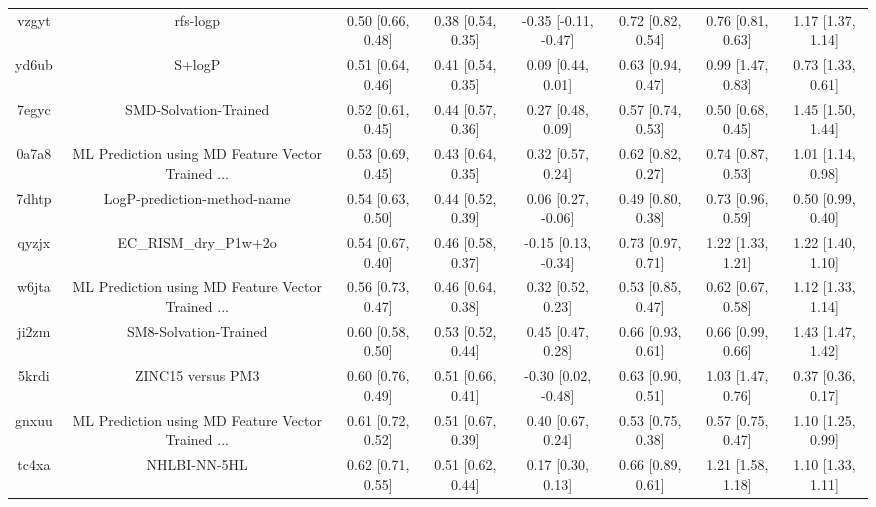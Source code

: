 \documentclass{article}
\begin{document}
\begin{center}
\begin{longtable}{|cccccccc|}
 vzgyt &                                           rfs-logp &  0.50 [0.66, 0.48] &  0.38 [0.54, 0.35] &  -0.35 [-0.11, -0.47] &  0.72 [0.82, 0.54] &     0.76 [0.81, 0.63] &     1.17 [1.37, 1.14] \\
 yd6ub &                                             S+logP &  0.51 [0.64, 0.46] &  0.41 [0.54, 0.35] &     0.09 [0.44, 0.01] &  0.63 [0.94, 0.47] &     0.99 [1.47, 0.83] &     0.73 [1.33, 0.61] \\
 7egyc &                              SMD-Solvation-Trained &  0.52 [0.61, 0.45] &  0.44 [0.57, 0.36] &     0.27 [0.48, 0.09] &  0.57 [0.74, 0.53] &     0.50 [0.68, 0.45] &     1.45 [1.50, 1.44] \\
 0a7a8 &  ML Prediction using MD Feature Vector Trained ... &  0.53 [0.69, 0.45] &  0.43 [0.64, 0.35] &     0.32 [0.57, 0.24] &  0.62 [0.82, 0.27] &     0.74 [0.87, 0.53] &     1.01 [1.14, 0.98] \\
 7dhtp &                        LogP-prediction-method-name &  0.54 [0.63, 0.50] &  0.44 [0.52, 0.39] &    0.06 [0.27, -0.06] &  0.49 [0.80, 0.38] &     0.73 [0.96, 0.59] &     0.50 [0.99, 0.40] \\
 qyzjx &                              EC\_RISM\_dry\_P1w+2o &  0.54 [0.67, 0.40] &  0.46 [0.58, 0.37] &   -0.15 [0.13, -0.34] &  0.73 [0.97, 0.71] &     1.22 [1.33, 1.21] &     1.22 [1.40, 1.10] \\
 w6jta &  ML Prediction using MD Feature Vector Trained ... &  0.56 [0.73, 0.47] &  0.46 [0.64, 0.38] &     0.32 [0.52, 0.23] &  0.53 [0.85, 0.47] &     0.62 [0.67, 0.58] &     1.12 [1.33, 1.14] \\
 ji2zm &                              SM8-Solvation-Trained &  0.60 [0.58, 0.50] &  0.53 [0.52, 0.44] &     0.45 [0.47, 0.28] &  0.66 [0.93, 0.61] &     0.66 [0.99, 0.66] &     1.43 [1.47, 1.42] \\
 5krdi &                                  ZINC15 versus PM3 &  0.60 [0.76, 0.49] &  0.51 [0.66, 0.41] &   -0.30 [0.02, -0.48] &  0.63 [0.90, 0.51] &     1.03 [1.47, 0.76] &     0.37 [0.36, 0.17] \\
 gnxuu &  ML Prediction using MD Feature Vector Trained ... &  0.61 [0.72, 0.52] &  0.51 [0.67, 0.39] &     0.40 [0.67, 0.24] &  0.53 [0.75, 0.38] &     0.57 [0.75, 0.47] &     1.10 [1.25, 0.99] \\
 tc4xa &                                       NHLBI-NN-5HL &  0.62 [0.71, 0.55] &  0.51 [0.62, 0.44] &     0.17 [0.30, 0.13] &  0.66 [0.89, 0.61] &     1.21 [1.58, 1.18] &     1.10 [1.33, 1.11] \\

\end{longtable}
\end{center}
\end{document}
